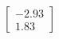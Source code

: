 \documentclass[preview]{standalone}
\begin{document}
\begin{align*}
\begin{bmatrix} -2.93 \\ 1.83 \end{bmatrix}
\end{align*}
\end{document}
